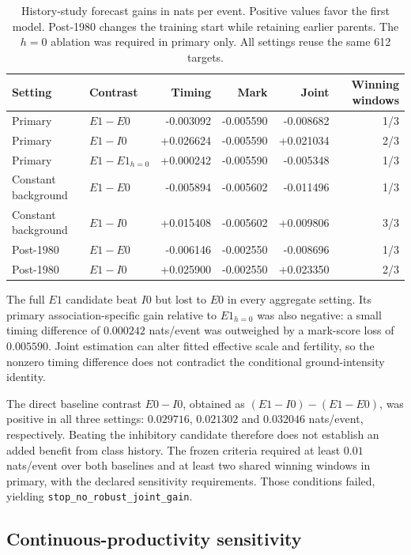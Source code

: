 \begin{table}[tbp]
\centering\small
\caption{History-study forecast gains in nats per event. Positive values
favor the first model. Post-1980 changes the training start while
retaining earlier parents. The \(h=0\) ablation was required in primary
only. All settings reuse the same 612 targets.}
\label{a2:history-results}
\begin{tabular}{llrrrr}
\toprule
Setting & Contrast & Timing & Mark & Joint & Winning windows\\
\midrule
Primary & \(E1-E0\) & -0.003092 & -0.005590 & -0.008682 & 1/3\\
Primary & \(E1-I0\) & +0.026624 & -0.005590 & +0.021034 & 2/3\\
Primary & \(E1-E1_{h=0}\) & +0.000242 & -0.005590 & -0.005348 & 1/3\\
Constant background & \(E1-E0\) & -0.005894 & -0.005602 & -0.011496 & 1/3\\
Constant background & \(E1-I0\) & +0.015408 & -0.005602 & +0.009806 & 3/3\\
Post-1980 & \(E1-E0\) & -0.006146 & -0.002550 & -0.008696 & 1/3\\
Post-1980 & \(E1-I0\) & +0.025900 & -0.002550 & +0.023350 & 2/3\\
\bottomrule
\end{tabular}
\end{table}

The full \(E1\) candidate beat \(I0\) but lost to \(E0\) in every aggregate
setting. Its primary association-specific gain relative to
\(E1_{h=0}\) was also negative: a small timing difference of
\(0.000242\) nats/event was outweighed by a mark-score loss of
\(0.005590\). Joint estimation can alter fitted effective scale and
fertility, so the nonzero timing difference does not contradict the
conditional ground-intensity identity.

The direct baseline contrast \(E0-I0\), obtained as
\((E1-I0)-(E1-E0)\), was positive in all three settings:
\(0.029716\), \(0.021302\) and \(0.032046\) nats/event, respectively.
Beating the inhibitory candidate therefore does not establish an added
benefit from class history. The frozen criteria required at least
\(0.01\) nats/event over both baselines and at least two shared winning
windows in primary, with the declared sensitivity requirements. Those
conditions failed, yielding \texttt{stop\_no\_robust\_joint\_gain}.

\subsection{Continuous-productivity sensitivity}


